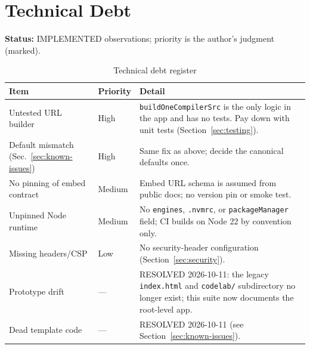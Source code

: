 \section{Technical Debt}
\label{sec:technical-debt}

\textbf{Status:} IMPLEMENTED observations; priority is the author's judgment (marked).

\begin{table}[H]
\centering
\caption{Technical debt register}
\begin{tabular}{|p{3cm}|l|p{6.8cm}|}
\hline
\textbf{Item} & \textbf{Priority} & \textbf{Detail} \\ \hline
Untested URL builder & High & \texttt{buildOneCompilerSrc} is the only logic in the app and has no tests. Pay down with unit tests (Section~\ref{sec:testing}). \\ \hline
Default mismatch (Sec.~\ref{sec:known-issues}) & High & Same fix as above; decide the canonical defaults once. \\ \hline
No pinning of embed contract & Medium & Embed URL schema is assumed from public docs; no version pin or smoke test. \\ \hline
Unpinned Node runtime & Medium & No \texttt{engines}, \texttt{.nvmrc}, or \texttt{packageManager} field; CI builds on Node 22 by convention only. \\ \hline
Missing headers/CSP & Low & No security-header configuration (Section~\ref{sec:security}). \\ \hline
Prototype drift & --- & RESOLVED 2026-10-11: the legacy \texttt{index.html} and \texttt{codelab/} subdirectory no longer exist; this suite now documents the root-level app. \\ \hline
Dead template code & --- & RESOLVED 2026-10-11 (see Section~\ref{sec:known-issues}). \\ \hline
\end{tabular}
\end{table}
